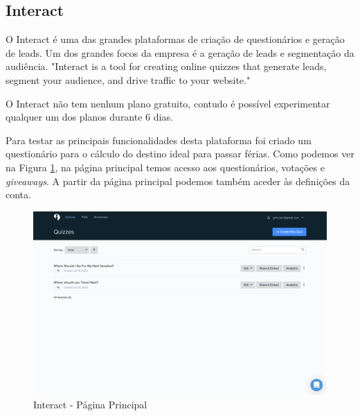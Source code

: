 \subsection{Interact}
\label{interact}

O Interact é uma das grandes plataformas de criação de questionários e geração de leads. Um dos grandes focos da empresa é a geração de leads e segmentação da audiência. "Interact is a tool for creating online quizzes that generate leads, segment your audience, and drive traffic to your website."\cite{interact}

O Interact não tem nenhum plano gratuito, contudo é possível experimentar qualquer um dos planos durante 6 dias. 

Para testar as principais funcionalidades desta plataforma foi criado um questionário para o cálculo do destino ideal para passar férias. Como podemos ver na Figura \ref{fig:interact-home}, na página principal temos acesso aos questionários, votações e \textit{giveaways}. A partir da página principal podemos também aceder às definições da conta.

\newpage

\begin{figure}[ht!]
	\begin{center}
		\includegraphics[width=1\textwidth]{img/interact/home}
		\caption{Interact - Página Principal}
		\label{fig:interact-home}
	\end{center}
\end{figure}


